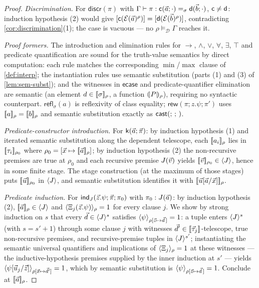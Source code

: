 \begin{proof}
\emph{Discrimination.}  For $\mathsf{discr}(\pi)$ with $\Gamma \vdash
\pi : \mathsf{c}(\vec{a};\cdot) =_\sigma \mathsf{d}(\vec{b};\cdot)$,
$\mathsf{c} \neq \mathsf{d}$: induction hypothesis (2) would give
$[\mathsf{c}(\mathcal{E}(\vec{a})^\rho)] =
[\mathsf{d}(\mathcal{E}(\vec{b})^\rho)]$, contradicting
\cref{cor:discrimination}(1); the case is vacuous --- no $\rho
\vDash_{\mathcal{D}} \Gamma$ reaches it.

\emph{Proof formers.}  The introduction and elimination rules for
$\to$, $\wedge$, $\vee$, $\forall$, $\exists$, $\top$ and predicate
quantification are sound for the truth-value semantics by direct
computation: each rule matches the corresponding $\min$/$\max$ clause
of \cref{def:interp}; the instantiation rules use semantic
substitution (parts (1) and (3) of \cref{lem:sem-subst}); and the
witnesses in $\mathsf{ecase}$ and predicate-quantifier elimination are
semantic (an element $d \in [\![ \sigma ]\!]_{\rho}$, a function
$(\!| P |\!)_\rho$), requiring no syntactic counterpart.
$\mathsf{refl}_\sigma(a)$ is reflexivity of class equality;
$\mathsf{rew}(\pi; z.\psi; \pi')$ uses $[\![ a ]\!]_\rho = [\![ b ]\!]_\rho$
and semantic substitution exactly as $\mathsf{cast}(;\,;\,)$.

\emph{Predicate-constructor introduction.}  For
$\mathsf{k}(\vec{a};\vec{\pi})$: by induction hypothesis (1) and iterated
semantic substitution along the dependent telescope, each
$[\![ a_i ]\!]_\rho$ lies in $[\![ \tau_i ]\!]_{\rho_0}$ where $\rho_0 =
[\vec{x} \mapsto [\![ \vec{a} ]\!]_\rho]$; by induction hypothesis (2) the
non-recursive premises are true at $\rho_0$ and each recursive premise
$J(\vec{v})$ yields $[\![ \vec{v} ]\!]_{\rho_0} \in \langle J \rangle$, hence in some
finite stage.  The stage construction (at the maximum of those stages)
puts $[\![ \vec{u} ]\!]_{\rho_0}$ in $\langle J \rangle$, and semantic substitution
identifies it with $[\![ \vec{u}[\vec{a}/\vec{x}] ]\!]_\rho$.

\emph{Predicate induction.}  For $\mathsf{ind}_{J}(\vec{z}.\psi; \vec{\pi};
\pi_0)$ with $\pi_0 : J(\vec{a})$: by induction hypothesis (2),
$[\![ \vec{a} ]\!]_\rho \in \langle J \rangle$ and $\langle \Xi_j(\vec{z}.\psi) \rangle_{\rho} =
1$ for every clause $j$.  We show by strong induction on $s$ that every
$\vec{d} \in \langle J \rangle^s$ satisfies $\langle \psi \rangle_{\rho[\vec{z} \mapsto
\vec{d}\,]} = 1$: a tuple enters $\langle J \rangle^{s}$ (with $s = s'+1$) through
some clause $j$ with witnesses $\vec{d}' \in
[\![ \vec{\tau}_j ]\!]_{}$-telescope, true non-recursive premises, and
recursive-premise tuples in $\langle J \rangle^{s'}$; instantiating the semantic
universal quantifiers and implications of $\langle \Xi_j \rangle_{\rho} = 1$ at
these witnesses --- the inductive-hypothesis premises supplied by the
inner induction at $s'$ --- yields
$\langle \psi[\vec{u}_j/\vec{z}] \rangle_{\rho[\vec{x} \mapsto
\vec{d}']} = 1$, which by semantic substitution is
$\langle \psi \rangle_{\rho[\vec{z} \mapsto \vec{d}\,]} = 1$.  Conclude at
$[\![ \vec{a} ]\!]_\rho$.


\end{proof}
